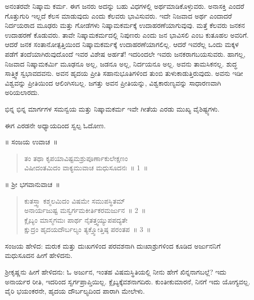 ಅನಂತರವೇ ನಿಷ್ಕಾಮ ಕರ್ಮ. ಈಗ ಜನರು ಅದನ್ನು ಬಹು ವಿಧಗಳಲ್ಲಿ ಅರ್ಥಮಾಡಿ\-ಕೊಳ್ಳುವರು. ಅನಾಸಕ್ತಿ ಎಂದರೆ ಗೊತ್ತುಗುರಿ ಇಲ್ಲದೆ ಕೆಲಸ ಮಾಡುವುದು ಎಂದು ಕೆಲವರು ಭಾವಿಸುವರು. ಇದೇ ನಿಜವಾದ ಅರ್ಥ ಎಂದಾದರೆ ನಿರ್ದಯರಾದ ಮೂಢರು ಮತ್ತು ಗೋಡೆಗಳು ನಿಷ್ಕಾಮಕರ್ಮಕ್ಕೆ ಉದಾಹರಣೆಯಾಗುವುವು. ಮತ್ತೆ ಕೆಲವರು ಜನಕನ ಉದಾಹರಣೆ ಕೊಡುವರು. ತಾವೇ ನಿಷ್ಕಾಮಕರ್ಮದಲ್ಲಿ ನಿಪುಣರು ಎಂದು ಜನ ಭಾವಿಸಲಿ ಎಂಬ ಕುತೂಹಲ ಅವರಿಗೆ. ಆದರೆ ಜನಕ ಸಂತಾನೋತ್ಪತ್ತಿಯಿಂದ ನಿಷ್ಕಾಮಕರ್ಮಕ್ಕೆ ಉದಾಹರಣೆಯಾಗಲಿಲ್ಲ. ಆದರೆ ಇವರೆಲ್ಲ ಒಂದು ಮಕ್ಕಳ ಪಡೆಗೆ ತಂದೆಯಾಗಿರುವುದೊಂದೆ ಇವರ ವಿಶೇಷ ಅರ್ಹತೆ! ಇದರಿಂದಲೇ ಇವರು ಜನಕರಾಗಬಯಸುವರು. ಹಾಗಲ್ಲ, ನಿಜವಾದ ನಿಷ್ಕಾಮಕರ್ಮಿ ಮೂಢನೂ ಅಲ್ಲ, ಜಡನೂ ಅಲ್ಲ, ನಿರ್ದಯನೂ ಅಲ್ಲ. ಅವನು ತಾಮಸಿಕನಲ್ಲ. ಶುದ್ಧ ಸಾತ್ತ್ವಿಕ ಸ್ವಭಾವದವನು. ಅವನ ಹೃದಯ ಪ್ರೀತಿ ಸಹಾನುಭೂತಿಗಳಿಂದ ತುಂಬಿ ತುಳುಕಾಡುತ್ತಿರುವುದು. ಅವನು ಇಡೀ ವಿಶ್ವವನ್ನು ಪ್ರೀತಿಯಿಂದ ಆಲಿಂಗಿಸಬಲ್ಲ. ಜಗತ್ತು ಅವನ ಪ್ರೀತಿಯನ್ನು, ವಿಶ್ವಕಾರುಣ್ಯವನ್ನು ಸಾಧಾರಣವಾಗಿ ಅರಿಯಲಾರದು.

ಭಿನ್ನ ಭಿನ್ನ ಮಾರ್ಗಗಳ ಸಮನ್ವಯ ಮತ್ತು ನಿಷ್ಕಾಮಕರ್ಮ ಇವೇ ಗೀತೆಯ ಎರಡು ಮುಖ್ಯ ವೈಶಿಷ್ಟ್ಯಗಳು.

ಈಗ ಎರಡನೇ ಅಧ್ಯಾಯದಿಂದ ಸ್ವಲ್ಪ ಓದೋಣ.

॥ ಸಂಜಯ ಉವಾಚ~॥

\begin{verse}
 ತಂ ತಥಾ ಕೃಪಯಾವಿಷ್ಟಮಶ್ರುಪೂರ್ಣಾಕುಲೇಕ್ಷಣಂ\\
 ವಿಷೀದಂತಮಿದಂ ವಾಕ್ಯಮುವಾಚ ಮಧುಸೂದನಃ~॥ 1~॥
\end{verse}

\newpage

॥ ಶ‍್ರೀ ಭಗವಾನುವಾಚ~॥

\begin{verse}
 ಕುತಸ್ತ್ವಾ ಕಶ್ಮಲಮಿದಂ ವಿಷಮೇ ಸಮುಪಸ್ಥಿತಮ್​\\
 ಅನಾರ್ಯಜುಷ್ಟ ಮಸ್ವರ್ಗಮಕೀರ್ತಿಕರಮರ್ಜುನ~॥ 2~॥\\
 ಕ್ಲೈಬ್ಯಂ ಮಾಸ್ಮಗಮಃ ಪಾರ್ಥ ನೈತತ್ತ್ವಯ್ಯುಪಪದ್ಯತೇ\\
 ಕ್ಷುದ್ರಂ ಹೃದಯದೌರ್ಬಲ್ಯಂ ತ್ಯಕ್ತ್ವೋತ್ತಿಷ್ಠ ಪರಂತಪ~॥ 3~॥
\end{verse}

ಸಂಜಯ ಹೇಳಿದ: ಮರುಕ ಮತ್ತು ದುಃಖಗಳಿಂದ ಪರವಶನಾಗಿ ದುಃಖಾಶ್ರುಗಳಿಂದ ಕೂಡಿದ ಅರ್ಜುನನಿಗೆ ಮಧುಸೂದನ ಹೀಗೆ ಹೇಳಿದನು.

ಶ‍್ರೀಕೃಷ್ಣನು ಹೀಗೆ ಹೇಳಿದನು: ಓ ಅರ್ಜುನ, ಇಂತಹ ವಿಷಮಸ್ಥಿತಿಯಲ್ಲಿ ನೀನು ಹೇಗೆ ಖಿನ್ನನಾಗಬಲ್ಲೆ? ಇದು ಅನಾರ್ಯರ ರೀತಿ, ಇದರಿಂದ ಸ್ವರ್ಗಪ್ರಾಪ್ತಿಯಿಲ್ಲ. ಕ್ಲೈಬ್ಯಕ್ಕೆ\break ವಶನಾಗದಿರು. ಕುಂತೀಕುಮಾರನೆ, ನಿನಗೆ ಇದು ಯೋಗ್ಯವಲ್ಲ. ವೈರಿ ಭಯಂಕರನೇ, ಹೃದಯ ದೌರ್ಬಲ್ಯದಿಂದ ಪಾರಾಗಿ ಮೇಲೇಳು.

